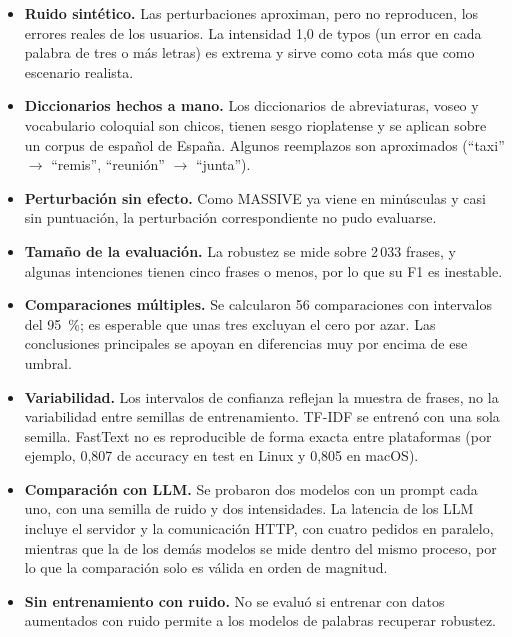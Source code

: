 \documentclass[11pt,a4paper]{article}
\begin{document}
\begin{itemize}
  \item \textbf{Ruido sintético.} Las perturbaciones aproximan, pero no reproducen, los errores
        reales de los usuarios. La intensidad 1,0 de typos (un error en cada palabra de tres o
        más letras) es extrema y sirve como cota más que como escenario realista.
  \item \textbf{Diccionarios hechos a mano.} Los diccionarios de abreviaturas, voseo y
        vocabulario coloquial son chicos, tienen sesgo rioplatense y se aplican sobre un
        corpus de español de España. Algunos reemplazos son aproximados (\enquote{taxi}
        $\to$ \enquote{remis}, \enquote{reunión} $\to$ \enquote{junta}).
  \item \textbf{Perturbación sin efecto.} Como MASSIVE ya viene en minúsculas y casi sin
        puntuación, la perturbación correspondiente no pudo evaluarse.
  \item \textbf{Tamaño de la evaluación.} La robustez se mide sobre 2\,033 frases, y algunas
        intenciones tienen cinco frases o menos, por lo que su F1 es inestable.
  \item \textbf{Comparaciones múltiples.} Se calcularon 56 comparaciones con intervalos del
        95~\%; es esperable que unas tres excluyan el cero por azar. Las conclusiones
        principales se apoyan en diferencias muy por encima de ese umbral.
  \item \textbf{Variabilidad.} Los intervalos de confianza reflejan la muestra de frases, no la
        variabilidad entre semillas de entrenamiento. TF-IDF se entrenó con una sola semilla.
        FastText no es reproducible de forma exacta entre plataformas (por ejemplo, 0,807 de
        accuracy en test en Linux y 0,805 en macOS).
  \item \textbf{Comparación con LLM.} Se probaron dos modelos con un prompt cada uno, con una
        semilla de ruido y dos intensidades. La latencia de los LLM incluye el servidor y la
        comunicación HTTP, con cuatro pedidos en paralelo, mientras que la de los demás
        modelos se mide dentro del mismo proceso, por lo que la comparación solo es válida en
        orden de magnitud.
  \item \textbf{Sin entrenamiento con ruido.} No se evaluó si entrenar con datos aumentados con
        ruido permite a los modelos de palabras recuperar robustez.
\end{itemize}

\end{document}
